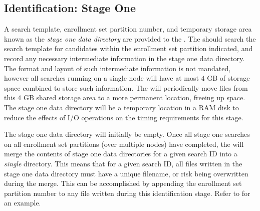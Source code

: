 \subsection{Identification: Stage One}
\label{subsec:api-identification_stage_one}

A search template, enrollment set partition number, and temporary storage area
known as the \textit{stage one data directory} are provided to the
\implementation. The \implementation should search the search template for
candidates within the enrollment set partition indicated, and record any
necessary intermediate information in the stage one data directory. The format
and layout of such intermediate information is not mandated, however all
searches running on a single node will have at most $4$ GB of storage space
combined to store such information. The \testdriver will periodically move files
from this $4$ GB shared storage area to a more permanent location, freeing up
space. The stage one data directory will be a temporary location in a RAM disk
to reduce the effects of I/O operations on the timing requirements for this
stage.

The stage one data directory will initially be empty. Once all stage one
searches on all enrollment set partitions (over multiple nodes) have completed,
the \testdriver will merge the contents of stage one data directories for a
given search ID into a \textit{single} directory. This means that for a given
search ID, all files written in the stage one data directory must have a unique
filename, or risk being overwritten during the merge. This can be accomplished
by appending the enrollment set partition number to any file written during this
identification stage. Refer to  for an example.

